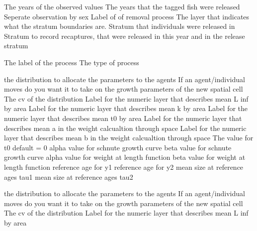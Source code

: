  {The years of the observed values}
 {The years that the tagged fish were released}
 {Seperate observation by sex}
 {Label of of removal process}
 {The layer that indicates what the stratum boundaries are.}
 {Stratum that individuals were released in}
 {Stratum to record recaptures, that were released in this year and in the release stratum}
\par\par
{} {The label of the process}
 {The type of process}
\par\textbf{}\par
{} {the distribution to allocate the parameters to the agents}
 {If an agent/individual moves do you want it to take on the growth parameters of the new spatial cell}
 {The cv of the distribution}
 {Label for the numeric layer that describes mean L inf by area}
 {Label for the numeric layer that describes mean k by area}
 {Label for the numeric layer that describes mean t0 by area}
 {Label for the numeric layer that describes mean a in the weight calcualtion through space}
 {Label for the numeric layer that describes mean b in the weight calcualtion through space}
 {The value for t0 default = 0}
 {alpha value for schnute growth curve}
 {beta value for schnute growth curve}
 {alpha value for weight at length function}
 {beta value for weight at length function}
 {reference age for y1}
 {reference age for y2}
 {mean size at reference ages tau1}
 {mean size at reference ages tau2}
 {}
 {}
 {}
 {}
\par\textbf{}\par
{} {the distribution to allocate the parameters to the agents}
 {If an agent/individual moves do you want it to take on the growth parameters of the new spatial cell}
 {The cv of the distribution}
 {Label for the numeric layer that describes mean L inf by area}

